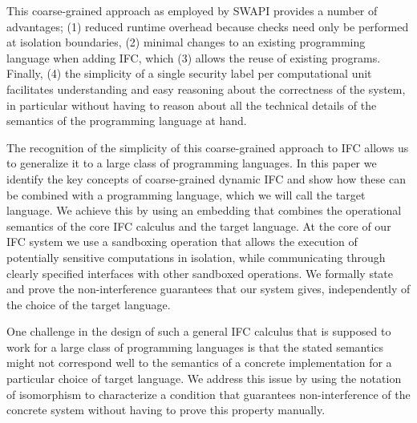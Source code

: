 This coarse-grained approach as employed by SWAPI provides a number
of advantages; (1) reduced runtime overhead because checks need only
be performed at isolation boundaries, (2) minimal changes to an
existing programming language when adding IFC, which (3) allows
the reuse of existing programs.  Finally, (4) the simplicity
of a single security label per computational unit facilitates
understanding and easy reasoning about the correctness of the
system, in particular without having to reason about all the
technical details of the semantics of the programming language
at hand.

The recognition of the simplicity of this coarse-grained approach
to IFC allows us to generalize it to a large class of programming
languages.  In this paper we identify the key concepts of coarse-grained
dynamic IFC and show how these can be combined with a programming
language, which we will call the target language.  We achieve this
by using an embedding that combines the operational semantics
of the core IFC calculus and the target language.
At the core of our IFC system we use a sandboxing operation that allows
the execution of potentially sensitive computations in isolation,
while communicating through clearly specified interfaces with other
sandboxed operations.
We formally state and prove the non-interference guarantees that our
system gives, independently of the choice of the target language.

One challenge in the design of such a general IFC calculus that
is supposed to work for a large class of programming languages is
that the stated semantics might not correspond well to the
semantics of a concrete implementation for a particular choice
of target language.  We address this issue by using the notation
of isomorphism to characterize a condition that guarantees
non-interference of the concrete system without having to prove
this property manually.

